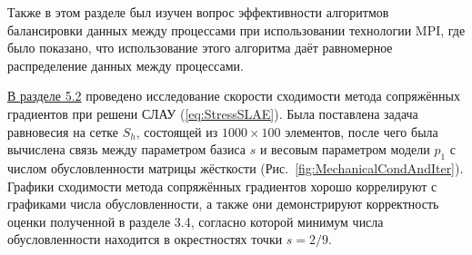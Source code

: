Также в этом разделе был изучен вопрос эффективности алгоритмов балансировки данных между процессами при использовании технологии MPI, где было показано, что использование этого алгоритма даёт равномерное распределение данных между процессами.

\underline{В разделе 5.2} проведено исследование скорости сходимости метода сопряжённых градиентов при решени СЛАУ (\ref{eq:StressSLAE}). Была поставлена задача равновесия на сетке $S_h$, состоящей из $1000 \times 100$ элементов, после чего была вычислена связь между параметром базиса $s$ и весовым параметром модели $p_1$ с числом обусловленности матрицы жёсткости (Рис.~\ref{fig:MechanicalCondAndIter}). Графики сходимости метода сопряжённых градиентов хорошо коррелируют с графиками числа обусловленности, а также они демонстрируют корректность оценки полученной в разделе 3.4, согласно которой минимум числа обусловленности находится в окрестностях точки $s = 2/9$.

